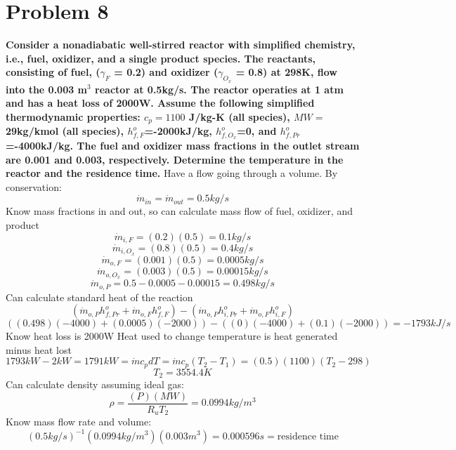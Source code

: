 \documentclass{article}
\begin{document}
\section*{Problem 8}
\textbf{Consider a nonadiabatic well-stirred reactor with simplified chemistry, i.e., fuel, oxidizer, and a single product species.  The reactants, consisting of fuel, ($\gamma_F$ = 0.2) and oxidizer ($\gamma_{O_x}$ = 0.8) at 298K, flow into the 0.003 m$^3$ reactor at 0.5kg/s.  The reactor operaties at 1 atm and has a heat loss of 2000W.  Assume the following simplified thermodynamic properties: $c_p=1100$ J/kg-K (all species), $MW=$29kg/kmol (all species), $h^o_{f,F}$=-2000kJ/kg, $h^o_{f,O_x}$=0, and $h^o_{f,Pr}$=-4000kJ/kg.  The fuel and oxidizer mass fractions in the outlet stream are 0.001 and 0.003, respectively.  Determine the temperature in the reactor and the residence time.} \newline
Have a flow going through a volume.  By conservation:
$$\dot{m}_{in}=\dot{m}_{out}=0.5kg/s$$
Know mass fractions in and out, so can calculate mass flow of fuel, oxidizer, and product
$$\dot{m}_{i,F}=(0.2)(0.5)=0.1kg/s$$
$$\dot{m}_{i,O_x}=(0.8)(0.5)=0.4kg/s$$
$$\dot{m}_{o,F}=(0.001)(0.5)=0.0005kg/s$$
$$\dot{m}_{o,O_x}=(0.003)(0.5)=0.00015kg/s$$
$$\dot{m}_{o,P}=0.5-0.0005-0.00015=0.498kg/s$$
Can calculate standard heat of the reaction
$$(\dot{m}_{o,P}h^o_{f,Pr}+\dot{m}_{o,F}h^o_{f,F})-(\dot{m}_{o,P}h^o_{i,Pr}+\dot{m}_{o,F}h^o_{i,F})$$
$$((0.498)(-4000)+(0.0005)(-2000))-((0)(-4000)+(0.1)(-2000))=-1793kJ/s$$
Know heat loss is 2000W
Heat used to change temperature is heat generated minus heat lost
$$1793kW-2kW=1791kW=\dot{m}c_pdT=\dot{m}c_p(T_2-T_1)=(0.5)(1100)(T_2-298)$$
$$T_2=3554.4K$$
Can calculate density assuming ideal gas:
$$\rho=\frac{(P)(MW)}{R_uT_2}=0.0994kg/m^3$$
Know mass flow rate and volume:
$$(0.5kg/s)^{-1}(0.0994kg/m^3)(0.003m^3)=0.000596s=\textrm{residence time}$$
\end{document}

